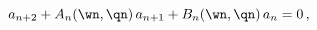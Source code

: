 \begin{equation}
a_{n+2} + A_n(\wn,\qn) \, a_{n+1} + B_n(\wn,\qn) \, a_n = 0\,, 
\label{recurrence}
\end{equation}

